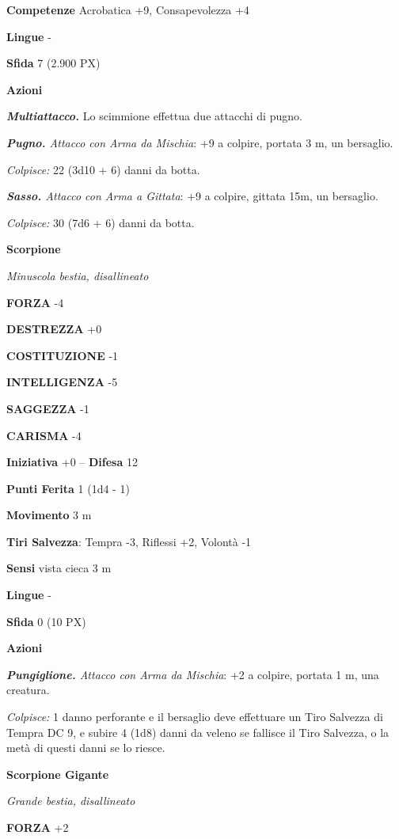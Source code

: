 \begin{multicols}{2}
\textbf{Competenze} Acrobatica +9, Consapevolezza +4

\textbf{Lingue} -

\textbf{Sfida} 7 (2.900 PX)

\textbf{Azioni}

\textit{\textbf{Multiattacco.}} Lo scimmione effettua due attacchi di pugno.

\textit{\textbf{Pugno.} Attacco con Arma da Mischia}: +9 a colpire, portata 3 m, un bersaglio.

\textit{Colpisce:} 22 (3d10 + 6) danni da botta.

\textit{\textbf{Sasso.} Attacco con Arma a Gittata}: +9 a colpire, gittata 15m, un bersaglio.

\textit{Colpisce:} 30 (7d6 + 6) danni da botta.

\medskip\textbf{Scorpione}

\textit{Minuscola bestia, disallineato}

\textbf{FORZA} -4

\textbf{DESTREZZA} +0

\textbf{COSTITUZIONE} -1

\textbf{INTELLIGENZA} -5

\textbf{SAGGEZZA} -1

\textbf{CARISMA} -4

\textbf{Iniziativa} +0 -- \textbf{Difesa} 12

\textbf{Punti Ferita} 1 (1d4 - 1)

\textbf{Movimento} 3 m

\textbf{Tiri Salvezza}: Tempra -3, Riflessi +2, Volontà -1

\textbf{Sensi} vista cieca 3 m

\textbf{Lingue} -

\textbf{Sfida} 0 (10 PX)

\textbf{Azioni}

\textit{\textbf{Pungiglione.} Attacco con Arma da Mischia}: +2 a colpire, portata 1 m, una creatura.

\textit{Colpisce:} 1 danno perforante e il bersaglio deve effettuare un Tiro Salvezza di Tempra DC 9, e subire 4 (1d8) danni da veleno se fallisce il Tiro Salvezza, o la metà di questi danni se lo riesce.

\medskip\textbf{Scorpione Gigante}

\textit{Grande bestia, disallineato}

\textbf{FORZA} +2


\end{multicols}
